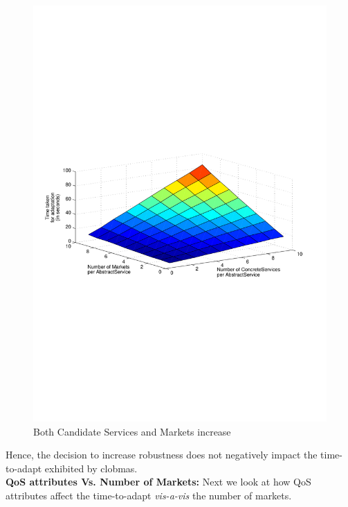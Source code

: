 \documentclass[10pt,journal,compsoc]{IEEEtran}
\begin{document}
\begin{figure}[htbp]%
	\centering
	\includegraphics[clip, trim=2cm 10cm 2cm 10cm, scale=0.5]{graphs/scaling_time_svcs_mkts.pdf}
	\caption{Both Candidate Services and Markets increase \label{fig:svc_and_mkts_scaling}}%
\end{figure}

Hence, the decision to increase robustness does not negatively impact the time-to-adapt exhibited by clobmas. \\
\textbf{QoS attributes Vs. Number of Markets:}
Next we look at how QoS attributes affect the time-to-adapt \textit{vis-a-vis} the number of markets. 
\end{document}
